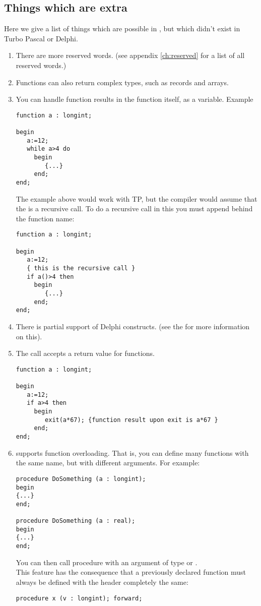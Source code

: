 \subsection{Things which are extra}
Here we give a list of things which are possible in \fpc, but which
didn't exist in Turbo Pascal or Delphi.
\begin{enumerate}
\item There are more reserved words. (see appendix \ref{ch:reserved} for a
list of all reserved words.)
\item Functions can also return complex types, such as records and arrays.
\item You can handle function results in the function itself, as a variable.
Example
\begin{verbatim}
function a : longint;

begin
   a:=12;
   while a>4 do
     begin
        {...}
     end;
end;
\end{verbatim}
The example above would work with TP, but the compiler would assume
that the  is a recursive call. To do a recursive call in
this you must append \var{()} behind the function name:
\begin{verbatim}
function a : longint;

begin
   a:=12;
   { this is the recursive call }
   if a()>4 then
     begin
        {...}
     end;
end;
\end{verbatim}
\item There is partial support of Delphi constructs. (see the \progref for
more information on this).
\item The  call accepts a return value for functions.
\begin{verbatim}
function a : longint;

begin
   a:=12;
   if a>4 then
     begin
        exit(a*67); {function result upon exit is a*67 }
     end;
end;
\end{verbatim}
\item \fpc supports function overloading. That is, you can define many
functions with the same name, but with different arguments. For example:
\begin{verbatim}
procedure DoSomething (a : longint);
begin
{...}
end;

procedure DoSomething (a : real);
begin
{...}
end;
\end{verbatim}
You can then call procedure  with an argument of type
 or .\\
This feature has the consequence that a previously declared function must
always be defined with the header completely the same:
\begin{verbatim}
procedure x (v : longint); forward;


\end{verbatim}
\end{enumerate}
